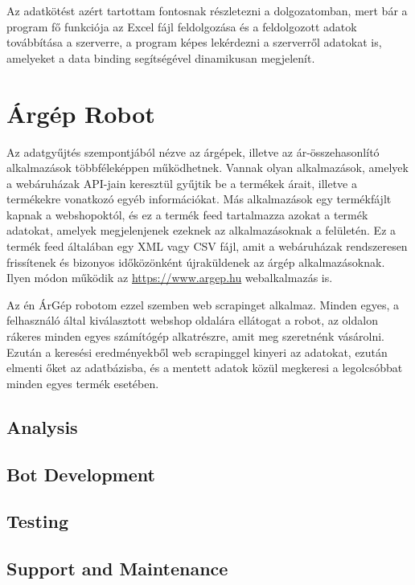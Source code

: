 \documentclass[
]{thesis-ekf}
\theoremstyle{definition}
\theoremstyle{remark}
\begin{document}

Az adatkötést azért tartottam fontosnak részletezni a dolgozatomban, mert bár a program fő funkciója az Excel fájl feldolgozása és a feldolgozott adatok továbbítása a szerverre, a program képes lekérdezni a szerverről adatokat is, amelyeket a data binding segítségével dinamikusan megjelenít.

\section{Árgép Robot}

Az adatgyűjtés szempontjából nézve az árgépek, illetve az ár-összehasonlító alkalmazások többféleképpen működhetnek. Vannak olyan alkalmazások, amelyek a webáruházak API-jain keresztül gyűjtik be a termékek árait, illetve a termékekre vonatkozó egyéb információkat. 
Más alkalmazások egy termékfájlt kapnak a webshopoktól, és ez a termék feed tartalmazza azokat a termék adatokat, amelyek megjelenjenek ezeknek az alkalmazásoknak a felületén. Ez a termék feed általában egy XML vagy CSV fájl, amit a webáruházak rendszeresen frissítenek és bizonyos időközönként újraküldenek az árgép alkalmazásoknak. Ilyen módon működik az \url{https://www.argep.hu} webalkalmazás is.

Az én ÁrGép robotom ezzel szemben web scrapinget alkalmaz. Minden egyes, a felhasználó által kiválasztott webshop oldalára ellátogat a robot, az oldalon rákeres minden egyes számítógép alkatrészre, amit meg szeretnénk vásárolni. Ezután a keresési eredményekből web scrapinggel kinyeri az adatokat, ezután elmenti őket az adatbázisba, és a mentett adatok közül megkeresi a legolcsóbbat minden egyes termék esetében.

\subsection{Analysis}
\subsection{Bot Development}
\subsection{Testing}
\subsection{Support and Maintenance}
\end{document}
